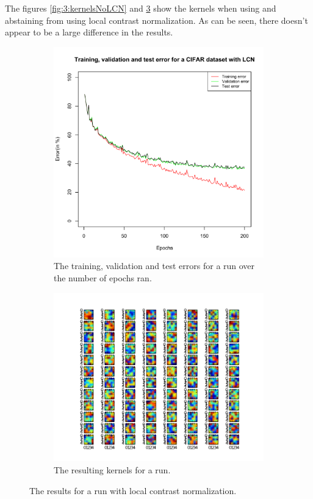 The figures \ref{fig:3:kernelsNoLCN} and \ref{fig:4:kernelsLCN} show the kernels when using and abstaining from using local contrast normalization. As can be seen, there doesn't appear to be a large difference in the results.


\begin{figure}[ht!]
	\centering
\begin{subfigure}[b]{0.45\textwidth}
	\includegraphics[width=\textwidth]{./img/Exercise3/Run2LCN/errorplots.pdf}	
	\caption{The training, validation and test errors for a run over the number of epochs ran.}
	\label{fig:6:errorsLCN}
\end{subfigure}
\begin{subfigure}[b]{0.45\textwidth}
	\includegraphics[width=\textwidth]{./img/Exercise3/Run2LCN/ass3final.png}	
	\caption{The resulting kernels for a run.}
	\label{fig:4:kernelsLCN}
\end{subfigure}
\caption{The results for a run with local contrast normalization.}
\end{figure}


